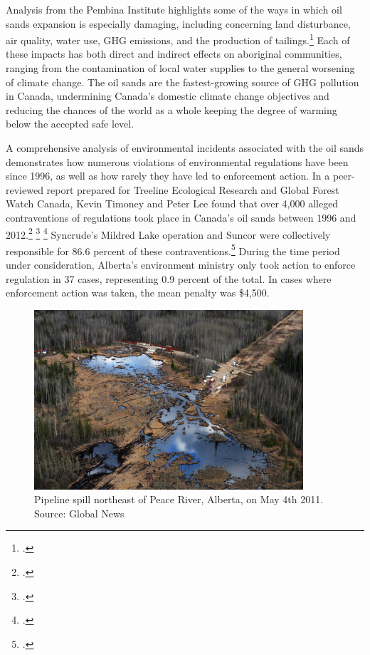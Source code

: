 Analysis from the Pembina Institute highlights some of the ways in which oil sands expansion is especially damaging, including concerning land disturbance, air quality, water use, GHG emissions, and the production of tailings.\footcite[][p. 1]{PembinaOilsandsExpansion}
Each of these impacts has both direct and indirect effects on aboriginal communities, ranging from the contamination of local water supplies to the general worsening of climate change.
The oil sands are the fastest-growing source of GHG pollution in Canada, undermining Canada's domestic climate change objectives and reducing the chances of the world as a whole keeping the degree of warming below the accepted safe level.



A comprehensive analysis of environmental incidents associated with the oil sands demonstrates how numerous violations of environmental regulations have been since 1996, as well as how rarely they have led to enforcement action.
In a peer-reviewed report prepared for Treeline Ecological Research and Global Forest Watch Canada, Kevin Timoney and Peter Lee found that over 4,000 alleged contraventions of regulations took place in Canada's oil sands between 1996 and 2012.\footcite[][p. 8]{OnePercentReport} \footcite[See also: ][]{GlobalFewerOnePercent} \footcite[See also: ][]{FinPoOnePercent}
Syncrude's Mildred Lake operation and Suncor were collectively responsible for 86.6 percent of these contraventions.\footcite[][p. 8]{OnePercentReport}
During the time period under consideration, Alberta's environment ministry only took action to enforce regulation in 37 cases, representing 0.9 percent of the total.
In cases where enforcement action was taken, the mean penalty was \$4,500.



\begin{figure}[h]
\includegraphics[width=100mm]{s3-pipeline-spill.png}
\centering
\caption{Pipeline spill northeast of Peace River, Alberta, on May 4th 2011. Source: Global News}
\label{fig:s3-pipeline-spill}
\end{figure}



